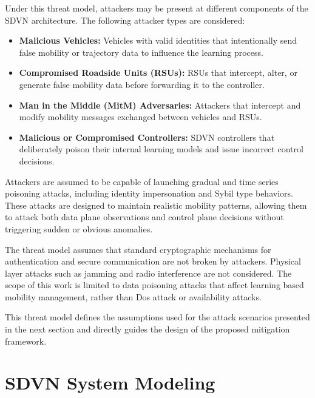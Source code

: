 \documentclass[12pt, a4paper]{report}
\begin{document}
Under this threat model, attackers may be present at different components of the SDVN architecture. The following attacker types are considered:

\begin{itemize}
	\item \textbf{Malicious Vehicles:} Vehicles with valid identities that intentionally send false mobility or trajectory data to influence the learning process.
	\item \textbf{Compromised Roadside Units (RSUs):} RSUs that intercept, alter, or generate false mobility data before forwarding it to the controller.
	\item \textbf{Man in the Middle (MitM) Adversaries:} Attackers that intercept and modify mobility messages exchanged between vehicles and RSUs.
	\item \textbf{Malicious or Compromised Controllers:} SDVN controllers that deliberately poison their internal learning models and issue incorrect control decisions.
\end{itemize}

Attackers are assumed to be capable of launching gradual and time
series poisoning attacks, including identity impersonation and
Sybil type behaviors. These attacks are designed to maintain
realistic mobility patterns, allowing them to attack both data plane
observations and control plane decisions without triggering sudden or
obvious anomalies.

The threat model assumes that standard cryptographic mechanisms for authentication and secure communication are not broken by attackers. Physical layer attacks such as jamming and radio interference are not considered. The scope of this work is limited to data poisoning attacks that affect learning based mobility management, rather than Dos attack or availability attacks.

This threat model defines the assumptions used for the attack scenarios presented in the next section and directly guides the design of the proposed mitigation framework.
\newpage
\section{SDVN System Modeling}
\end{document}
